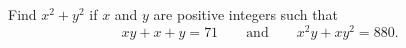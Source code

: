 Find $x^2+y^2$ if $x$ and $y$ are positive integers such that \[xy+x+y = 71\qquad\text{and}\qquad x^2y+xy^2 = 880.\]